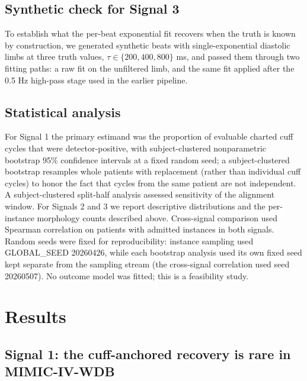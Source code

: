 \documentclass[twocolumn,letterpaper,10pt]{article}
\begin{document}
\subsection{Synthetic check for Signal 3}

To establish what the per-beat exponential fit recovers when the truth is known by construction, we generated synthetic beats with single-exponential diastolic limbs at three truth values, $\tau \in \{200, 400, 800\}$ ms, and passed them through two fitting paths: a raw fit on the unfiltered limb, and the same fit applied after the 0.5 Hz high-pass stage used in the earlier pipeline.

\subsection{Statistical analysis}

For Signal 1 the primary estimand was the proportion of evaluable charted cuff cycles that were detector-positive, with subject-clustered nonparametric bootstrap 95\% confidence intervals at a fixed random seed; a subject-clustered bootstrap resamples whole patients with replacement (rather than individual cuff cycles) to honor the fact that cycles from the same patient are not independent. A subject-clustered split-half analysis assessed sensitivity of the alignment window. For Signals 2 and 3 we report descriptive distributions and the per-instance morphology counts described above. Cross-signal comparison used Spearman correlation on patients with admitted instances in both signals. Random seeds were fixed for reproducibility: instance sampling used GLOBAL\_SEED 20260426, while each bootstrap analysis used its own fixed seed kept separate from the sampling stream (the cross-signal correlation used seed 20260507). No outcome model was fitted; this is a feasibility study.

\section{Results}

\subsection{Signal 1: the cuff-anchored recovery is rare in MIMIC-IV-WDB}
\end{document}
